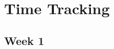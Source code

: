 \chapter{Time Tracking}
\label{App: Time Tracking}

\section*{Week 1}

\begin{table}[H]
	\centering
\begin{tabular}{p{} p{} p{}}

\end{tabular}
\end{table}